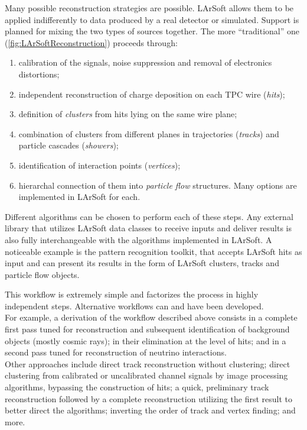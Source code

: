 Many possible reconstruction strategies are possible.
LArSoft allows them to be applied indifferently to data produced by a real detector or simulated.
Support is planned for mixing the two types of sources together.
The more ``traditional'' one (\cref{fig:LArSoftReconstruction}) proceeds through:
\begin{enumerate}
  \item calibration of the signals, noise suppression and removal of electronics distortions;
  \item independent reconstruction of charge deposition on each TPC wire (\emph{hits});
  \item definition of \emph{clusters} from hits lying on the same wire plane;
  \item combination of clusters from different planes in trajectories (\emph{tracks}) and particle cascades (\emph{showers});
  \item identification of interaction points (\emph{vertices});
  \item hierarchal connection of them into \emph{particle flow} structures. Many options are implemented in LArSoft for each.
\end{enumerate}
Different algorithms can be chosen to perform each of these steps.
Any external library that utilizes LArSoft data classes to receive inputs
and deliver results is also fully interchangeable with the algorithms implemented in LArSoft.
A noticeable example is the \Pandora pattern recognition toolkit,
that accepts LArSoft hits as input and can present its results in the form of LArSoft clusters,
tracks and particle flow objects.

This workflow is extremely simple and factorizes the process in highly independent steps.
Alternative workflows can and have been developed.\\
For example, a derivation of the workflow described above consists in a complete
first pass tuned for reconstruction and subsequent identification of background
objects (mostly cosmic rays); in their elimination at the level of hits;
and in a second pass tuned for reconstruction of neutrino interactions.\\
Other approaches include direct track reconstruction without clustering;
direct clustering from calibrated or uncalibrated channel signals by image processing algorithms,
bypassing the construction of hits;
a quick, preliminary track reconstruction
followed by a complete reconstruction utilizing the first result to better direct the algorithms;
inverting the order of track and vertex finding;
and more.

